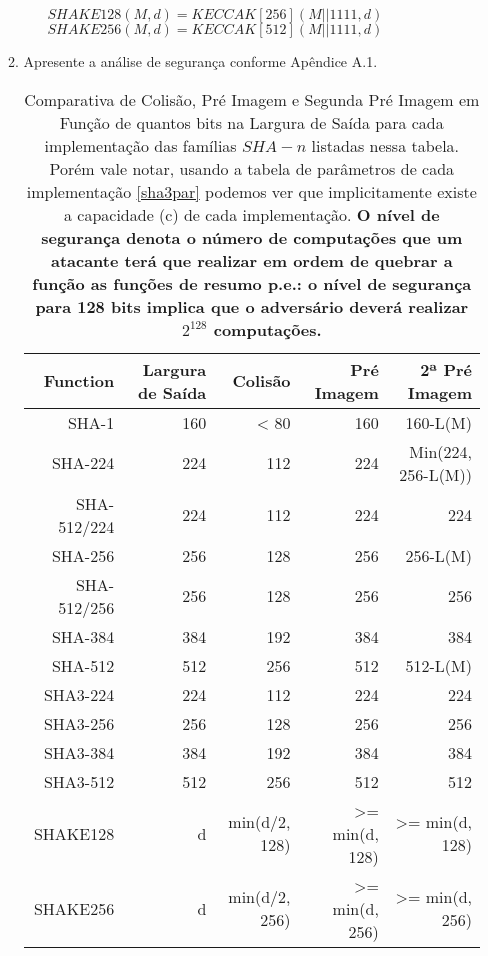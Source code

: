 \documentclass[12pt, a4paper]{article}
\begin{document}
\begin{enumerate}
\begin{enumerate}
\begin{enumerate}
$SHAKE128(M, d) = KECCAK[256] (M || 1111, d)$\\

$SHAKE256(M, d) = KECCAK[512] (M || 1111, d)$\\

\end{enumerate}

\item Apresente a análise de segurança conforme Apêndice A.1.\\

\begin{table}[ht!]
  \centering
  \begin{tabular}[c]{@{}|r|r|r|r|r|@{}}
    \hline
    Function & Largura de Saída & Colisão & Pré Imagem & 2ª Pré Imagem \\\hline
    SHA-1 & 160 & \textless{} 80 & 160 & 160-L(M) \\\hline
    SHA-224 & 224 & 112 & 224 & Min(224, 256-L(M)) \\\hline
    SHA-512/224 & 224 & 112 & 224 & 224 \\\hline
    SHA-256 & 256 & 128 & 256 & 256-L(M) \\\hline
    SHA-512/256 & 256 & 128 & 256 & 256 \\\hline
    SHA-384 & 384 & 192 & 384 & 384 \\\hline
    SHA-512 & 512 & 256 & 512 & 512-L(M) \\\hline
    SHA3-224 & 224 & 112 & 224 & 224 \\\hline
    SHA3-256 & 256 & 128 & 256 & 256 \\\hline
    SHA3-384 & 384 & 192 & 384 & 384 \\\hline
    SHA3-512 & 512 & 256 & 512 & 512 \\\hline
    SHAKE128 & d & min(d/2, 128) & \textgreater{}= min(d, 128) &
    \textgreater{}= min(d, 128) \\\hline
    SHAKE256 & d & min(d/2, 256) & \textgreater{}= min(d, 256) &
    \textgreater{}= min(d, 256) \\\hline
  \end{tabular}
  \caption{Comparativa de Colisão, Pré Imagem e Segunda Pré Imagem em Função
  de quantos bits na Largura de Saída para cada implementação das famílias
  $SHA-n$ listadas nessa tabela. Porém vale notar, usando a tabela de parâmetros
  de cada implementação \ref{sha3par} podemos ver que implicitamente existe a
  capacidade (c) de cada implementação. {\bfseries O nível de segurança denota o
  número de computações que um atacante terá que realizar em ordem de quebrar a
  função as funções de resumo p.e.: o nível de segurança para 128 bits implica
  que o adversário deverá realizar $2^{128}$ computações.}}
\end{table}


\end{enumerate}
\end{enumerate}
\end{document}
